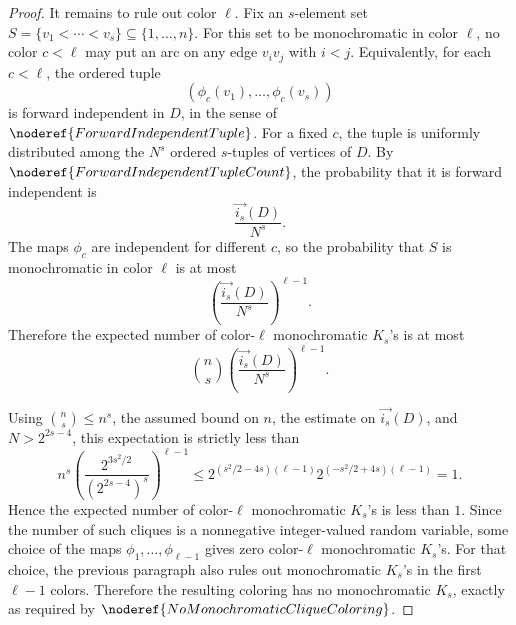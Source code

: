 \begin{proof}
It remains to rule out color \(\ell\). Fix an \(s\)-element set \(S=\{v_1<\cdots<v_s\}\subseteq \{1,\ldots,n\}\). For this set to be monochromatic in color \(\ell\), no color \(c<\ell\) may put an arc on any edge \(v_i v_j\) with \(i<j\). Equivalently, for each \(c<\ell\), the ordered tuple
\[
  (\phi_c(v_1),\ldots,\phi_c(v_s))
\]
is forward independent in \(D\), in the sense of \(\noderef{ForwardIndependentTuple}\). For a fixed \(c\), the tuple is uniformly distributed among the \(N^s\) ordered \(s\)-tuples of vertices of \(D\). By \(\noderef{ForwardIndependentTupleCount}\), the probability that it is forward independent is
\[
  \frac{\overrightarrow{i_s}(D)}{N^s}.
\]
The maps \(\phi_c\) are independent for different \(c\), so the probability that \(S\) is monochromatic in color \(\ell\) is at most
\[
  \left(\frac{\overrightarrow{i_s}(D)}{N^s}\right)^{\ell-1}.
\]
Therefore the expected number of color-\(\ell\) monochromatic \(K_s\)'s is at most
\[
  \binom ns\left(\frac{\overrightarrow{i_s}(D)}{N^s}\right)^{\ell-1}.
\]

Using \(\binom ns\le n^s\), the assumed bound on \(n\), the estimate on \(\overrightarrow{i_s}(D)\), and \(N>2^{2s-4}\), this expectation is strictly less than
\[
  n^s
  \left(\frac{2^{3s^2/2}}{(2^{2s-4})^s}\right)^{\ell-1}
  \le
  2^{(s^2/2-4s)(\ell-1)}
  2^{(-s^2/2+4s)(\ell-1)}
  =1.
\]
Hence the expected number of color-\(\ell\) monochromatic \(K_s\)'s is less than \(1\). Since the number of such cliques is a nonnegative integer-valued random variable, some choice of the maps \(\phi_1,\ldots,\phi_{\ell-1}\) gives zero color-\(\ell\) monochromatic \(K_s\)'s. For that choice, the previous paragraph also rules out monochromatic \(K_s\)'s in the first \(\ell-1\) colors. Therefore the resulting coloring has no monochromatic \(K_s\), exactly as required by \(\noderef{NoMonochromaticCliqueColoring}\).
\end{proof}
